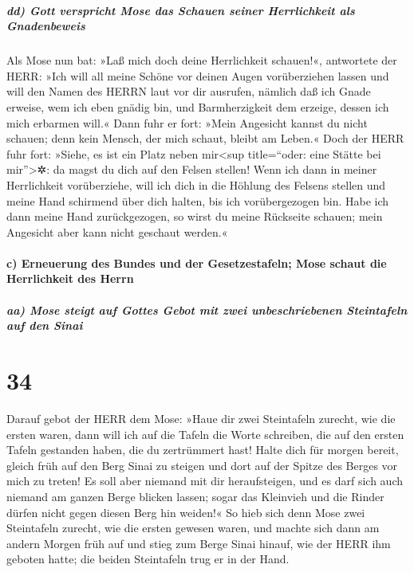 \hypertarget{dd-gott-verspricht-mose-das-schauen-seiner-herrlichkeit-als-gnadenbeweis}{%
\subparagraph{dd) Gott verspricht Mose das Schauen seiner Herrlichkeit
als
Gnadenbeweis}\label{dd-gott-verspricht-mose-das-schauen-seiner-herrlichkeit-als-gnadenbeweis}}

 Als Mose nun bat: »Laß mich doch deine Herrlichkeit
schauen!«,  antwortete der HERR: »Ich will all meine
Schöne vor deinen Augen vorüberziehen lassen und will den Namen des
HERRN laut vor dir ausrufen, nämlich daß ich Gnade erweise, wem ich eben
gnädig bin, und Barmherzigkeit dem erzeige, dessen ich mich erbarmen
will.«  Dann fuhr er fort: »Mein Angesicht kannst du
nicht schauen; denn kein Mensch, der mich schaut, bleibt am Leben.«
 Doch der HERR fuhr fort: »Siehe, es ist ein Platz neben
mir\textless sup title=``oder: eine Stätte bei mir''\textgreater✲: da
magst du dich auf den Felsen stellen!  Wenn ich dann in
meiner Herrlichkeit vorüberziehe, will ich dich in die Höhlung des
Felsens stellen und meine Hand schirmend über dich halten, bis ich
vorübergezogen bin.  Habe ich dann meine Hand
zurückgezogen, so wirst du meine Rückseite schauen; mein Angesicht aber
kann nicht geschaut werden.«

\hypertarget{c-erneuerung-des-bundes-und-der-gesetzestafeln-mose-schaut-die-herrlichkeit-des-herrn}{%
\paragraph{c) Erneuerung des Bundes und der Gesetzestafeln; Mose schaut
die Herrlichkeit des
Herrn}\label{c-erneuerung-des-bundes-und-der-gesetzestafeln-mose-schaut-die-herrlichkeit-des-herrn}}

\hypertarget{aa-mose-steigt-auf-gottes-gebot-mit-zwei-unbeschriebenen-steintafeln-auf-den-sinai}{%
\subparagraph{aa) Mose steigt auf Gottes Gebot mit zwei unbeschriebenen
Steintafeln auf den
Sinai}\label{aa-mose-steigt-auf-gottes-gebot-mit-zwei-unbeschriebenen-steintafeln-auf-den-sinai}}

\hypertarget{section-33}{%
\section{34}\label{section-33}}

 Darauf gebot der HERR dem Mose: »Haue dir zwei
Steintafeln zurecht, wie die ersten waren, dann will ich auf die Tafeln
die Worte schreiben, die auf den ersten Tafeln gestanden haben, die du
zertrümmert hast!  Halte dich für morgen bereit, gleich
früh auf den Berg Sinai zu steigen und dort auf der Spitze des Berges
vor mich zu treten!  Es soll aber niemand mit dir
heraufsteigen, und es darf sich auch niemand am ganzen Berge blicken
lassen; sogar das Kleinvieh und die Rinder dürfen nicht gegen diesen
Berg hin weiden!«  So hieb sich denn Mose zwei Steintafeln
zurecht, wie die ersten gewesen waren, und machte sich dann am andern
Morgen früh auf und stieg zum Berge Sinai hinauf, wie der HERR ihm
geboten hatte; die beiden Steintafeln trug er in der Hand.

